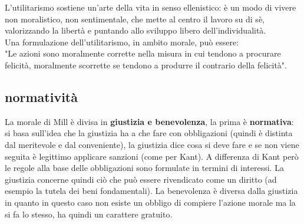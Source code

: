 \documentclass[10pt,a4paper]{article}
\begin{document}
L'utilitarismo sostiene un'arte della vita in senso ellenistico: è un modo di vivere non moralistico, non sentimentale, che mette al centro il lavoro su di sè, valorizzando la libertà e puntando allo sviluppo libero dell'individualità.\\
Una formulazione dell'utilitarismo, in ambito morale, può essere:\\
"Le azioni sono moralmente corrette nella misura in cui tendono a procurare felicità, moralmente scorrette se tendono a produrre il contrario della felicità".
\subsection{normatività}
La morale di Mill è divisa in \textbf{giustizia e benevolenza}, la prima è \textbf{normativa}: si basa sull'idea che la giustizia ha a che fare con obbligazioni (quindi è distinta dal meritevole e dal conveniente), la giustizia dice cosa si deve fare e se non viene seguita è legittimo applicare sanzioni (come per Kant). A differenza di Kant però le regole alla base delle obbligazioni sono formulate in termini di interessi. La giustizia concerne quindi ciò che può essere rivendicato come un diritto (ad esempio la tutela dei beni fondamentali). La benevolenza è diversa dalla giustizia in quanto in questo caso non esiste un obbligo di compiere l'azione morale ma la si fa lo stesso, ha quindi un carattere gratuito.  
\end{document}
